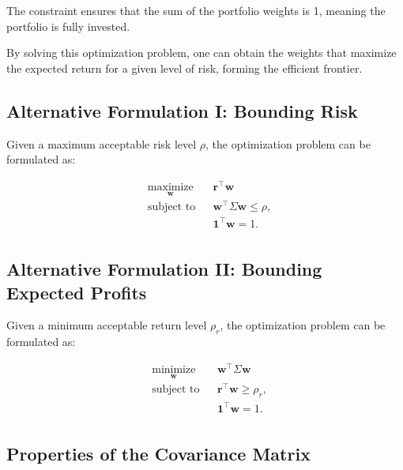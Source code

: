 The constraint ensures that the sum of the portfolio weights is 1, meaning the portfolio is fully invested.

By solving this optimization problem, one can obtain the weights that maximize the expected return for a given level of risk, forming the efficient frontier.

\subsection{Alternative Formulation I: Bounding Risk}

Given a maximum acceptable risk level $\rho$, the optimization problem can be formulated as:

\begin{equation}
\begin{aligned}
& \underset{\mathbf{w}}{\text{maximize}}
& & \mathbf{r}^\top\mathbf{w} \\
& \text{subject to}
& & \mathbf{w}^\top \Sigma \mathbf{w} \leq \rho, \\
& & & \mathbf{1}^\top\mathbf{w} = 1. \\
\end{aligned}
\end{equation}

\subsection{Alternative Formulation II: Bounding Expected Profits}

Given a minimum acceptable return level $\rho_r$, the optimization problem can be formulated as:

\begin{equation}
\begin{aligned}
& \underset{\mathbf{w}}{\text{minimize}}
& & \mathbf{w}^\top \Sigma \mathbf{w} \\
& \text{subject to}
& & \mathbf{r}^\top\mathbf{w} \geq \rho_r, \\
& & & \mathbf{1}^\top\mathbf{w} = 1. \\
\end{aligned}
\end{equation}


\subsection{Properties of the Covariance Matrix}

